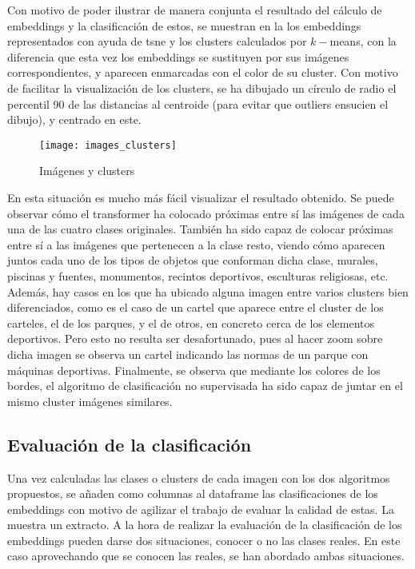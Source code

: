 				Con motivo de poder ilustrar de manera conjunta el resultado del cálculo de embeddings y la clasificación de estos, se muestran en la  los embeddings representados con ayuda de \gls{tsne} y los clusters calculados por $k-$means, con la diferencia que esta vez los embeddings se sustituyen por sus imágenes correspondientes, y aparecen enmarcadas con el color de su cluster. Con motivo de facilitar la visualización de los clusters, se ha dibujado un círculo de radio el percentil 90 de las distancias al centroide (para evitar que outliers ensucien el dibujo), y centrado en este. \\
				
				\begin{figure}[!h]
					\centering
					\texttt{[image: images\_clusters]}
					\caption{Imágenes y clusters}
					\label{fig:embeddings_visuales}
				\end{figure} 
				
				En esta situación es mucho más fácil visualizar el resultado obtenido. Se puede observar cómo el transformer ha colocado próximas entre sí las imágenes de cada una de las cuatro clases originales. También ha sido capaz de colocar próximas entre sí a las imágenes que pertenecen a la clase resto, viendo cómo aparecen juntos cada uno de los tipos de objetos que conforman dicha clase, murales, piscinas y fuentes, monumentos, recintos deportivos, esculturas religiosas, etc. Además, hay casos en los que ha ubicado alguna imagen entre varios clusters bien diferenciados, como es el caso de un cartel que aparece entre el cluster de los carteles, el de los parques, y el de otros, en concreto cerca de los elementos deportivos. Pero esto no resulta ser desafortunado, pues al hacer zoom sobre dicha imagen se observa un cartel indicando las normas de un parque con máquinas deportivas. Finalmente, se observa que mediante los colores de los bordes, el algoritmo de clasificación no supervisada ha sido capaz de juntar en el mismo cluster imágenes similares. 
				
			\subsection{Evaluación de la clasificación}
			
				Una vez calculadas las clases o clusters de cada imagen con los dos algoritmos propuestos, se añaden como columnas al dataframe las clasificaciones de los embeddings con motivo de agilizar el trabajo de evaluar la calidad de estas. La  muestra un extracto. A la hora de realizar la evaluación de la clasificación de los embeddings pueden darse dos situaciones, conocer o no las clases reales. En este caso aprovechando que se conocen las reales, se han abordado ambas situaciones.
			
